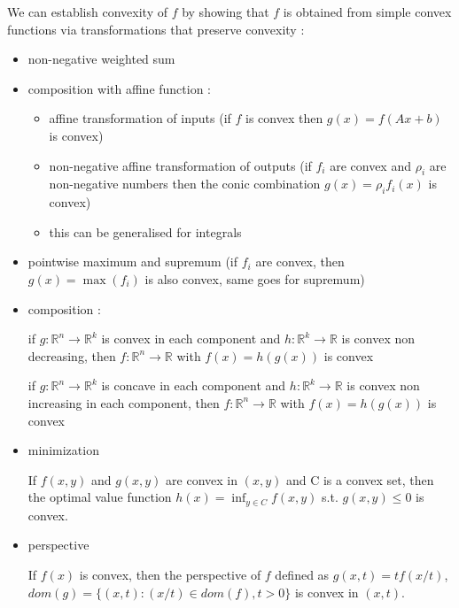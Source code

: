 \documentclass[../main.tex]{subfiles}
\begin{document}
We can establish convexity of $f$ by showing that $f$ is obtained from simple convex functions via transformations that preserve convexity : \begin{itemize}
    \item non-negative weighted sum
    \item composition with affine function : \begin{itemize}
        \item affine transformation of inputs (if $f$ is convex then $g(x) = f(Ax+b)$ is convex)
        \item non-negative affine transformation of outputs (if $f_i$ are convex and $\rho_i$ are non-negative numbers then the conic combination $g(x) = \rho_i f_i(x)$ is convex)
        \item this can be generalised for integrals
    \end{itemize}
    \item pointwise maximum and supremum (if $f_i$ are convex, then $g(x) = \max(f_i)$ is also convex, same goes for supremum)
    \item composition : \begin{theorem}
        if $g: \mathbb{R}^n \rightarrow \mathbb{R}^k$ is convex in each component and $h: \mathbb{R}^k \rightarrow \mathbb{R}$ is convex non decreasing, then $f: \mathbb{R}^n \rightarrow \mathbb{R}$ with $f(x) = h(g(x))$ is convex
    \end{theorem}
    \begin{theorem}
        if $g: \mathbb{R}^n \rightarrow \mathbb{R}^k$ is concave in each component and $h: \mathbb{R}^k \rightarrow \mathbb{R}$ is convex non increasing in each component, then $f: \mathbb{R}^n \rightarrow \mathbb{R}$ with $f(x) = h(g(x))$ is convex
    \end{theorem}
    \item minimization \begin{theorem}
        If $f(x,y)$ and $g(x,y)$ are convex in $(x,y)$ and C is a convex set, then the optimal value function $h(x) = \inf_{y \in C} f(x,y)$ s.t. $g(x,y) \leq 0$ is convex.
    \end{theorem}
    \item perspective \begin{theorem}
        If $f(x)$ is convex, then the perspective of $f$ defined as $g(x,t) = tf(x/t)$, $dom(g) = \{(x,t) : (x/t) \in dom(f), t>0 \}$ is convex in $(x,t)$.
    \end{theorem}
\end{itemize}
\end{document}
